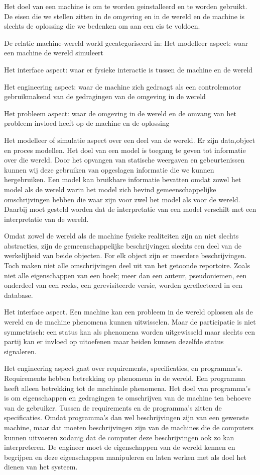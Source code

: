 Het doel van een machine is om te worden geinstalleerd en te worden gebruikt. De eisen die we stellen zitten in de omgeving en in de wereld en de machine is slechts de oplossing die we bedenken om aan een eis te voldoen. 

De relatie machine-wereld world gecategoriseerd in: 
Het modelleer aspect: waar een machine de wereld simuleert 

Het interface aspect: waar er fysieke interactie is tussen de machine en de wereld 

Het engineering aspect: waar de machine zich gedraagt als een controlemotor gebruikmakend van de gedragingen van de omgeving in de wereld 

Het probleem aspect: waar de omgeving in de wereld en de omvang van het probleem invloed heeft op de machine en de oplossing 

Het modelleer  of simulatie aspect over een deel van de wereld. Er zijn data,object en proces modellen. Het doel van een model is toegang te geven tot informatie over die wereld. Door het opvangen van statische weergaven en gebeurtenissen kunnen wij deze gebruiken van opgeslagen informatie die we kunnen hergebruiken. Een model kan bruikbare informatie bevatten omdat zowel het model als de wereld warin het model zich bevind gemeenschappelijke omschrijvingen hebben die waar zijn voor zwel het model als voor de wereld. Daarbij moet gesteld worden dat de interpretatie van een model verschilt met een interpretatie van de wereld. 

Omdat zowel de wereld als de machine fysieke realiteiten zijn an niet slechts abstracties, zijn de gemeenschappelijke beschrijvingen slechts een deel van de werkelijheid van beide objecten. For elk object zijn er meerdere beschrijvingen. Toch maken niet alle omschrijvingen deel uit van het getoonde reportoire. Zoals niet alle eigenschappen van een boek; meer dan een auteur, pseudoniemen, een onderdeel van een reeks, een gerevisiteerde versie, worden gereflecteerd in een database.  

Het interface aspect. Een machine kan een probleem in de wereld oplossen als de wereld en de machine phenomena kunnen uitwisselen. Maar de participatie is niet symmetrisch: een status kan als phenomena worden uitgewisseld maar slechts een partij kan er invloed op uitoefenen maar beiden kunnen dezelfde status signaleren. 

Het engineering aspect gaat over requirements, specificaties, en programma’s. Requirements hebben betrekking op phenomena in de wereld. Een programma heeft alleen betrekking tot de machinale phenomena. Het doel van programma’s is om eigenschappen en gedragingen te omschrijven van de machine ten behoeve van de gebruiker. Tussen de requirements en de programma’s zitten de specificaties. Omdat programma’s dan wel beschrijvingen zijn van een gewenste machine, maar dat moeten beschrijvingen zijn van de  machines  die de computers kunnen uitvoeren zodanig dat de computer deze beschrijvingen ook zo kan interpreteren. De engineer moet  de eigenschappen van de wereld kennen en begrijpen en deze eigenschappen manipuleren en laten werken met als doel het dienen van het systeem. 

